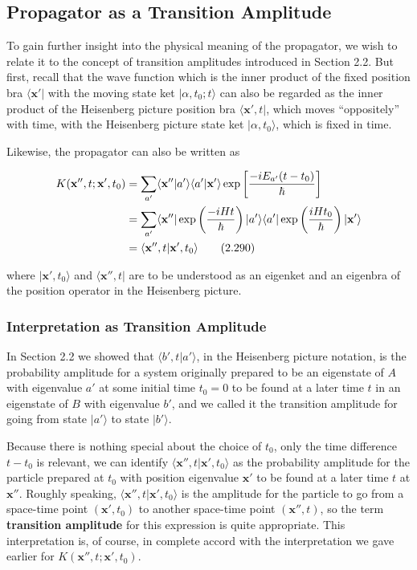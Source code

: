 \documentclass[11pt,a4paper]{article}
\begin{document}
\subsection{Propagator as a Transition Amplitude}

To gain further insight into the physical meaning of the propagator, we wish to relate it to the concept of transition amplitudes introduced in Section 2.2. But first, recall that the wave function which is the inner product of the fixed position bra $\langle \mathbf{x}'|$ with the moving state ket $|\alpha, t_0; t\rangle$ can also be regarded as the inner product of the Heisenberg picture position bra $\langle \mathbf{x}', t|$, which moves ``oppositely'' with time, with the Heisenberg picture state ket $|\alpha, t_0\rangle$, which is fixed in time.

Likewise, the propagator can also be written as

\begin{align}
K(\mathbf{x}'', t; \mathbf{x}', t_0) &= \sum_{a'} \langle \mathbf{x}''|a'\rangle\langle a'|\mathbf{x}'\rangle \exp\left[\frac{-iE_{a'}(t - t_0)}{\hbar}\right] \notag \\
&= \sum_{a'} \langle \mathbf{x}''|\exp\left(\frac{-iHt}{\hbar}\right)|a'\rangle\langle a'|\exp\left(\frac{iHt_0}{\hbar}\right)|\mathbf{x}'\rangle \notag \\
&= \langle \mathbf{x}'', t|\mathbf{x}', t_0\rangle
\tag{2.290}
\end{align}

where $|\mathbf{x}', t_0\rangle$ and $\langle \mathbf{x}'', t|$ are to be understood as an eigenket and an eigenbra of the position operator in the Heisenberg picture.

\subsubsection{Interpretation as Transition Amplitude}

In Section 2.2 we showed that $\langle b', t|a'\rangle$, in the Heisenberg picture notation, is the probability amplitude for a system originally prepared to be an eigenstate of $A$ with eigenvalue $a'$ at some initial time $t_0 = 0$ to be found at a later time $t$ in an eigenstate of $B$ with eigenvalue $b'$, and we called it the transition amplitude for going from state $|a'\rangle$ to state $|b'\rangle$.

Because there is nothing special about the choice of $t_0$, only the time difference $t - t_0$ is relevant, we can identify $\langle \mathbf{x}'', t|\mathbf{x}', t_0\rangle$ as the probability amplitude for the particle prepared at $t_0$ with position eigenvalue $\mathbf{x}'$ to be found at a later time $t$ at $\mathbf{x}''$. Roughly speaking, $\langle \mathbf{x}'', t|\mathbf{x}', t_0\rangle$ is the amplitude for the particle to go from a space-time point $(\mathbf{x}', t_0)$ to another space-time point $(\mathbf{x}'', t)$, so the term \textbf{transition amplitude} for this expression is quite appropriate. This interpretation is, of course, in complete accord with the interpretation we gave earlier for $K(\mathbf{x}'', t; \mathbf{x}', t_0)$.
\end{document}
